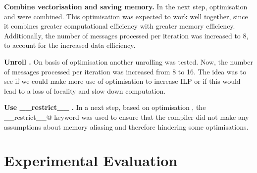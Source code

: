 \documentclass[final,letterpaper]{article}
\newcommand{\mypar}[1]{{\bf #1.}}
\begin{document}
\mypar{Combine vectorisation and saving memory}
In the next step, optimisation  and  were combined. This optimisation was expected to work well together, since it combines greater computational efficiency with greater memory efficiency. Additionally, the number of messages processed per iteration was increased to 8, to account for the increased data efficiency.


\mypar{Unroll }
On basis of optimisation  another unrolling was tested. Now, the number of messages processed per iteration was increased from 8 to 16. The idea was to see if we could make more use of optimisation  to increase ILP or if this would lead to a loss of locality and slow down computation.


\mypar{Use \_\_restrict\_\_ }
In a next step, based on optimisation , the \verb@__restrict__@ keyword was used to ensure that the compiler did not make any assumptions about memory aliasing and therefore hindering some optimisations.

%
%
%
%


\section{Experimental Evaluation}\label{sec:exp}
\end{document}
